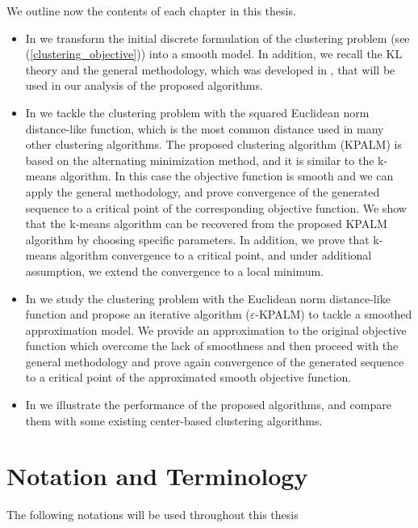 We outline now the contents of each chapter in this thesis.
\begin{itemize}
	\item In  we transform the initial discrete formulation  of the clustering problem (see (\ref{clustering_objective})) into a smooth model. In addition, we recall the KL theory and the general methodology, which was developed in \cite{BST2014}, that will be used in our analysis of the proposed algorithms.
	\item In  we tackle the clustering problem with the squared Euclidean norm distance-like function, which is the most common distance used in many other clustering algorithms. The proposed clustering algorithm (KPALM) is based on the alternating minimization method, and it is similar to the k-means algorithm. In this case the objective function is smooth and we can apply the general methodology, and prove convergence of the generated sequence to a critical point of the corresponding objective function. We show that the k-means algorithm can be recovered from the proposed KPALM algorithm by choosing specific parameters. In addition, we prove that k-means algorithm convergence to a critical point, and under additional assumption, we extend the convergence to a local minimum.
	\item In  we study the clustering problem with the Euclidean norm distance-like function and propose an iterative algorithm ($\varepsilon$-KPALM) to tackle a smoothed approximation model. We provide an approximation to the original objective function which overcome the lack of smoothness and then proceed with the general methodology and prove again convergence of the generated sequence to a critical point of the approximated smooth objective function.
	\item In  we illustrate the performance of the proposed algorithms, and compare them with some existing center-based clustering algorithms.
\end{itemize}

\clearpage
\section{Notation and Terminology}

The following notations will be used throughout this thesis


